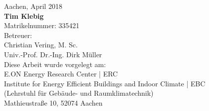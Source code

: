 \begin{titlepage}
\begin{addmargin}[\marginCoverPage]{0cm}
\vfill
\begin{center}
\begingroup
{}\selectfont
Aachen, April 2018 \\
\addvspace{0.5cm}
\textbf{Tim Klebig} \\
Matrikelnummer: 335421 \\
\addvspace{0.5cm}
Betreuer:\\
Christian Vering, M. Sc. \\
Univ.-Prof. Dr.-Ing. Dirk Müller \\
\addvspace{0.5cm}
Diese Arbeit wurde vorgelegt am:\\
E.ON Energy Research Center | ERC \\
Institute for Energy Efficient Buildings and Indoor Climate | EBC\\
(Lehrstuhl für Gebäude- und Raumklimatechnik)\\
Mathieustraße 10, 52074 Aachen\\
\endgroup
\end{center}
\end{addmargin}
\end{titlepage}


